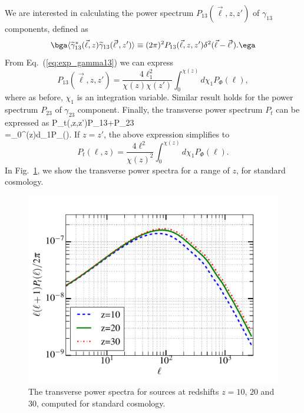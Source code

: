 We are interested in calculating the power spectrum $P_{13}(\vec{\ell},z,z')$ of $\gamma_{13}$ components, defined as
\begin{equation}
\bga
\langle\widetilde{\gamma}_{13}^*(\vec{\ell},z)\widetilde{\gamma}_{13}(\vec{\ell}',z')\rangle\equiv(2\pi)^2P_{13}(\vec{\ell},z,z')\delta^2(\vec{\ell}-\vec{\ell}').
\ega
\end{equation}
From Eq.~(\ref{eq:exp_gamma13}) we can express
\begin{equation}
P_{13}(\vec{\ell},z,z')=\frac{4\ell_1^2}{\chi(z)\chi(z')}\int_0^{\chi(z)}d\chi_1P_{\Phi}(\ell),
\end{equation}
where as before, $\chi_1$ is an integration variable.
Similar result holds for the power spectrum $P_{23}$ of $\gamma_{23}$ component. Finally, the transverse power spectrum $P_t$ can be expressed as 
\beq
\bga
P_t(\ell,z,z')\equiv P_{13}+P_{23}\\
=\int_0^{\chi(z)}d\chi_1P_{\Phi}(\ell).
\ega
\eeq
If $z=z'$, the above expression simplifies to
\begin{equation}
P_t(\ell,z)=\frac{4\ell^2}{\chi(z)^2}\int_0^{\chi(z)}d\chi_1P_{\Phi}(\ell).
\end{equation}
In Fig.~\ref{fig:Pt}, we show the transverse power spectra for a range of $z$, for standard cosmology.
\begin{figure}
\centering
\includegraphics[scale=0.45]{lensing_transverse.pdf}
\caption{The transverse power spectra for sources at redshifts $z=10$, $20$ and $30$, computed for standard cosmology.}
\label{fig:Pt}
\end{figure}

